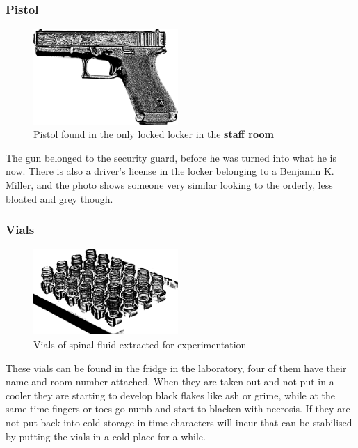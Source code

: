 \documentclass[bg-full]{resources/stylesheets/kult}
\begin{document}
\subsubsection{Pistol}%
\label{ssub:pistol}

\begin{figure}[!htbp]
  \includegraphics[width=5.5cm, keepaspectratio]{resources/img/glock.png}
  \caption{Pistol found in the only locked locker in the \textbf{staff room}}\label{pistol}
\end{figure}
The gun belonged to the security guard, before he was turned into what he is now.  There is also a driver's license in the
locker belonging to a Benjamin K. Miller, and the photo shows someone very similar looking to the
\hyperref[ssub:orderly]{orderly}, less bloated and grey though.


\subsubsection{Vials}%
\label{ssub:vials}

\begin{figure}[!htbp]
  \centering
  \includegraphics[width=5.5cm, keepaspectratio]{resources/img/test tubes.png}
  \caption{Vials of spinal fluid extracted for experimentation}\label{vials}
\end{figure}
These vials can be found in the fridge in the laboratory, four of them have their name and room number attached.  When they are
taken out and not put in a cooler they are starting to develop black flakes like ash or grime, while at the same time fingers
or toes go numb and start to blacken with necrosis.  If they are not put back into cold storage in time characters will incur
 that can be stabilised by putting the vials in a cold place for a while.
\end{document}
